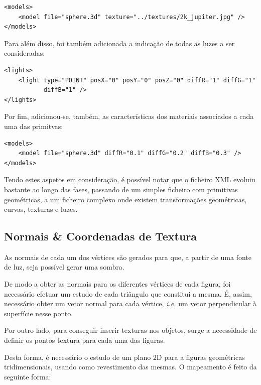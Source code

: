 \documentclass[a4paper, 11pt]{article}
\begin{document}
\begin{verbatim}
<models>
    <model file="sphere.3d" texture="../textures/2k_jupiter.jpg" /> 
</models>
\end{verbatim}

Para além disso, foi também adicionada a indicação de todas as luzes a ser consideradas: 

\begin{verbatim}
<lights>
    <light type="POINT" posX="0" posY="0" posZ="0" diffR="1" diffG="1"
           diffB="1" />
</lights>
\end{verbatim}

Por fim, adicionou-se, também, as características dos materiais associados a cada uma das 
primitvas:

\begin{verbatim}
<models>
    <model file="sphere.3d" diffR="0.1" diffG="0.2" diffB="0.3" />
</models>
\end{verbatim}

Tendo estes aspetos em consideração, é possível notar que o ficheiro XML evoluiu bastante ao 
longo das fases, passando de um simples ficheiro com primitivas geométricas, a um ficheiro 
complexo onde existem transformações geométricas, curvas, texturas e luzes. 

\subsection{Normais \& Coordenadas de Textura}

As normais de cada um dos vértices são gerados para que, a partir de uma fonte de luz, seja 
possível gerar uma sombra. 

De modo a obter as normais para os diferentes vértices de cada figura, foi necessário efetuar um 
estudo de cada triângulo que constitui a mesma. É, assim, necessário obter um vetor normal para 
cada vértice, \textit{i.e.} um vetor perpendicular à superfície nesse ponto.

Por outro lado, para conseguir inserir texturas nos objetos, surge a necessidade de definir os 
pontos textura para cada uma das figuras.

Desta forma, é necessário o estudo de um plano 2D para a figuras geométricas tridimensionais, 
usando como revestimento das mesmas. O mapeamento é feito da seguinte forma:
\end{document}
